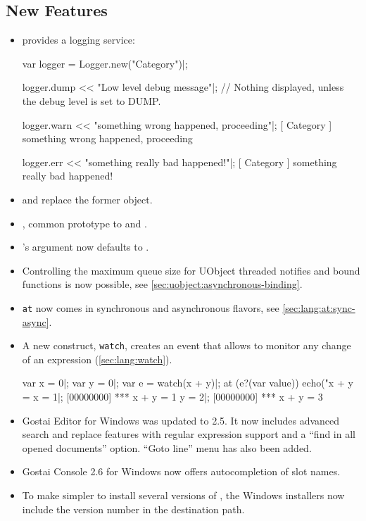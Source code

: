 \subsection{New Features}
\begin{itemize}
\item {} provides a logging service:
\begin{urbiscript}
var logger = Logger.new("Category")|;

logger.dump << "Low level debug message"|;
// Nothing displayed, unless the debug level is set to DUMP.

logger.warn << "something wrong happened, proceeding"|;
[       Category        ] something wrong happened, proceeding

logger.err << "something really bad happened!"|;
[       Category        ] something really bad happened!
\end{urbiscript}

\item {} and  replace the
  former  object.

\item {}, common prototype to  and
  .

\item {}'s argument now defaults to
  .

\item Controlling the maximum queue size for UObject threaded notifies and
  bound functions is now possible, see
  \autoref{sec:uobject:asynchronous-binding}.

\item \lstinline{at} now comes in synchronous and asynchronous flavors, see
  \autoref{sec:lang:at:sync-async}.

\item A new construct, \lstinline{watch}, creates an event that allows to
  monitor any change of an expression (\autoref{sec:lang:watch}).
\begin{urbiscript}[firstnumber=1]
var x = 0|;
var y = 0|;
var e = watch(x + y)|;
at (e?(var value))
  echo("x + y = %
x = 1|;
[00000000] *** x + y = 1
y = 2|;
[00000000] *** x + y = 3
\end{urbiscript}

\item Gostai Editor for Windows was updated to 2.5.  It now includes
  advanced search and replace features with regular expression support and a
  ``find in all opened documents'' option. ``Goto line'' menu has also been
  added.

\item Gostai Console 2.6 for Windows now offers autocompletion of \us slot
  names.

\item To make simpler to install several versions of \usdk, the Windows
  installers now include the version number in the destination path.
\end{itemize}

